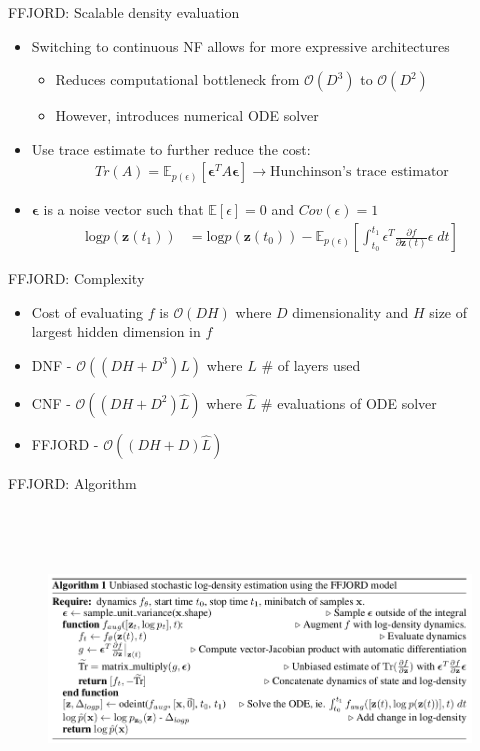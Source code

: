 \begin{frame}{FFJORD: Scalable density evaluation}
\begin{itemize}
    \item Switching to continuous NF allows for more expressive architectures
    \begin{itemize}
        \item Reduces computational bottleneck from $\mathcal{O}(D^3)$ to $\mathcal{O}(D^2)$
        \item However, introduces numerical ODE solver
    \end{itemize}
    \item Use trace estimate to further reduce the cost:
    \begin{align*}
        Tr(A) = \mathbb{E}_{p(\epsilon)}[\mathbf{\epsilon}^T A \mathbf{\epsilon}] \longrightarrow \text{Hunchinson's trace estimator}
    \end{align*}
    \item $\mathbf{\epsilon}$ is a noise vector such that $\mathbb{E}[\epsilon] = 0$ and $Cov(\epsilon) = 1$
    \begin{align*}
        \text{log} p(\mathbf{z}(t_1)) &= \text{log} p(\mathbf{z}(t_0)) - \mathbb{E}_{p(\epsilon)}[\int^{t_1}_{t_0} \epsilon^T \frac{\partial f}{\partial \mathbf{z}(t)} \epsilon \; dt]
    \end{align*}
\end{itemize}
\end{frame}
\begin{frame}{FFJORD: Complexity}
\begin{itemize}
    \item Cost of evaluating $f$ is $\mathcal{O}(DH)$ where $D$ dimensionality and $H$ size of largest hidden dimension in $f$
    \item DNF - $\mathcal{O}((DH+D^3)L)$ where $L$ \# of layers used
    \item CNF - $\mathcal{O}((DH+D^2)\hat{L})$ where $\hat{L}$ \# evaluations of ODE solver
    \item FFJORD - $\mathcal{O}((DH+D)\hat{L})$
\end{itemize}
\end{frame}
\begin{frame}{FFJORD: Algorithm}
\begin{figure}
    \centering
    \includegraphics[width=\textwidth, height=8cm,keepaspectratio]{Images/ffjord_algorithm.png}
    \label{fig:ffjord_algorithm}
\end{figure}
\end{frame}
